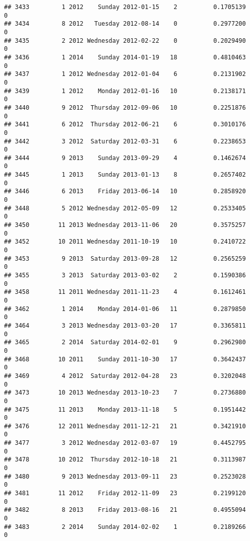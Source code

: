 \documentclass[
]{article}
\begin{document}
\begin{verbatim}
## 3433         1 2012    Sunday 2012-01-15    2          0.1705139             0
## 3434         8 2012   Tuesday 2012-08-14    0          0.2977200             0
## 3435         2 2012 Wednesday 2012-02-22    0          0.2029490             0
## 3436         1 2014    Sunday 2014-01-19   18          0.4810463             0
## 3437         1 2012 Wednesday 2012-01-04    6          0.2131902             0
## 3439         1 2012    Monday 2012-01-16   10          0.2138171             0
## 3440         9 2012  Thursday 2012-09-06   10          0.2251876             0
## 3441         6 2012  Thursday 2012-06-21    6          0.3010176             0
## 3442         3 2012  Saturday 2012-03-31    6          0.2238653             0
## 3444         9 2013    Sunday 2013-09-29    4          0.1462674             0
## 3445         1 2013    Sunday 2013-01-13    8          0.2657402             0
## 3446         6 2013    Friday 2013-06-14   10          0.2858920             0
## 3448         5 2012 Wednesday 2012-05-09   12          0.2533405             0
## 3450        11 2013 Wednesday 2013-11-06   20          0.3575257             0
## 3452        10 2011 Wednesday 2011-10-19   10          0.2410722             0
## 3453         9 2013  Saturday 2013-09-28   12          0.2565259             0
## 3455         3 2013  Saturday 2013-03-02    2          0.1590386             0
## 3458        11 2011 Wednesday 2011-11-23    4          0.1612461             0
## 3462         1 2014    Monday 2014-01-06   11          0.2879850             0
## 3464         3 2013 Wednesday 2013-03-20   17          0.3365811             0
## 3465         2 2014  Saturday 2014-02-01    9          0.2962980             0
## 3468        10 2011    Sunday 2011-10-30   17          0.3642437             0
## 3469         4 2012  Saturday 2012-04-28   23          0.3202048             0
## 3473        10 2013 Wednesday 2013-10-23    7          0.2736880             0
## 3475        11 2013    Monday 2013-11-18    5          0.1951442             0
## 3476        12 2011 Wednesday 2011-12-21   21          0.3421910             0
## 3477         3 2012 Wednesday 2012-03-07   19          0.4452795             0
## 3478        10 2012  Thursday 2012-10-18   21          0.3113987             0
## 3480         9 2013 Wednesday 2013-09-11   23          0.2523028             0
## 3481        11 2012    Friday 2012-11-09   23          0.2199120             0
## 3482         8 2013    Friday 2013-08-16   21          0.4955094             0
## 3483         2 2014    Sunday 2014-02-02    1          0.2189266             0

\end{verbatim}
\end{document}
